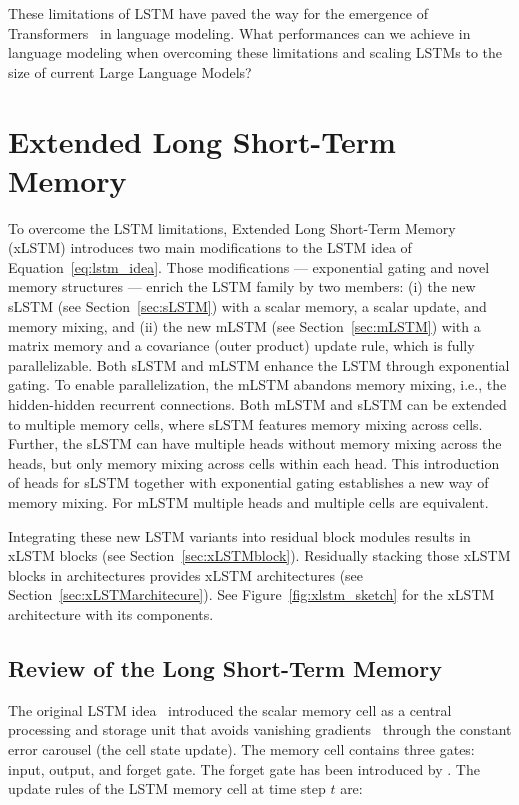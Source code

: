 These limitations of LSTM have paved the way for the emergence of Transformers~\citep{Vaswani:17} in language modeling. What performances can we achieve in language modeling when overcoming these limitations and scaling LSTMs to the size of current Large Language Models? 

\section{Extended Long Short-Term Memory}
\label{sec:xLSTM}

To overcome the LSTM limitations, Extended Long Short-Term Memory (xLSTM) introduces two main modifications to the LSTM idea of Equation~\eqref{eq:lstm_idea}.
Those modifications --- exponential gating and novel memory structures --- enrich the LSTM family by two members: (i) the new sLSTM (see Section~\ref{sec:sLSTM}) with a scalar memory, a scalar update, and memory mixing, and (ii) the new mLSTM (see Section~\ref{sec:mLSTM}) with a matrix memory and a covariance (outer product) update rule, which is fully parallelizable. Both sLSTM and mLSTM enhance the LSTM through exponential gating. To enable parallelization, the mLSTM abandons memory mixing, i.e., the hidden-hidden recurrent connections. Both mLSTM and sLSTM can be extended to multiple memory cells, where sLSTM features memory mixing across cells. Further, the sLSTM can have multiple heads without memory mixing across the heads, but only memory mixing across cells within each head. This introduction of heads for sLSTM together with exponential gating establishes a new way of memory mixing. For mLSTM multiple heads and multiple cells are equivalent.

Integrating these new LSTM variants into residual block modules results in xLSTM blocks (see Section~\ref{sec:xLSTMblock}). Residually stacking those xLSTM blocks in architectures provides xLSTM architectures (see Section~\ref{sec:xLSTMarchitecure}).
See Figure~\ref{fig:xlstm_sketch} for the xLSTM architecture with its components.

\subsection{Review of the Long Short-Term Memory}
\label{sec:orgLSTM}

The original LSTM idea~\citep{Hochreiter:91,Hochreiter:97nips,Hochreiter:97} introduced the scalar memory cell as a central processing and storage unit that avoids vanishing gradients~\citep{Hochreiter:91,Hochreiter:00book} through the constant error carousel (the cell state update). The memory cell contains three gates: input, output, and forget gate. The forget gate has been introduced by \citet{Gers:00}. 
The update rules of the LSTM memory cell at time step $t$ are:

